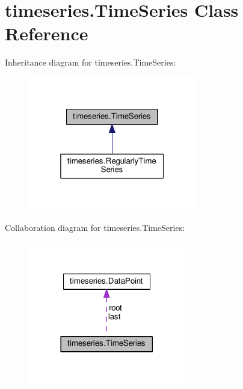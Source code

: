 \hypertarget{classtimeseries_1_1_time_series}{}\section{timeseries.\+Time\+Series Class Reference}
\label{classtimeseries_1_1_time_series}


Inheritance diagram for timeseries.\+Time\+Series\+:
\nopagebreak
\begin{figure}[H]
\begin{center}
\leavevmode
\includegraphics[width=208pt]{classtimeseries_1_1_time_series__inherit__graph}
\end{center}
\end{figure}


Collaboration diagram for timeseries.\+Time\+Series\+:
\nopagebreak
\begin{figure}[H]
\begin{center}
\leavevmode
\includegraphics[width=194pt]{classtimeseries_1_1_time_series__coll__graph}
\end{center}
\end{figure}
